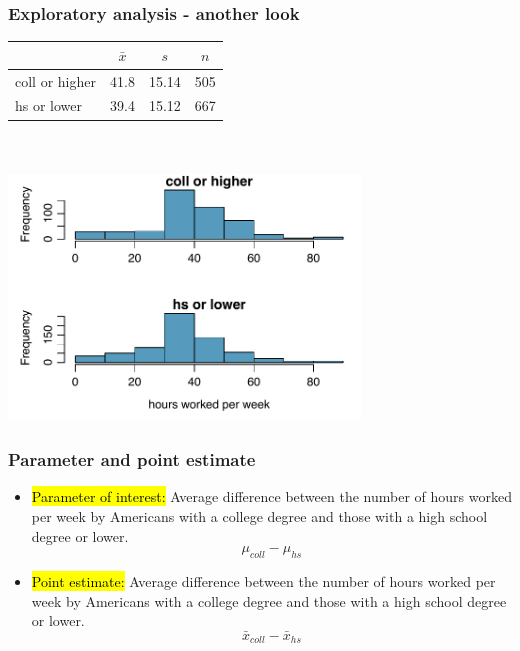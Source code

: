 \begin{frame}
\frametitle{Exploratory analysis - another look}

\begin{center}
\begin{tabular}{lccc}
\hline
  		& $\bar{x}$ 	& $s$	& $n$ \\
\hline
coll or higher	& 41.8		& 15.14	& 505 \\
hs or lower	& 39.4		& 15.12	& 667 \\
\hline
\end{tabular}
$\:$ \\
\vspace{0.5cm}
$\:$ \\
\includegraphics[width=0.7\textwidth]{5-2_diff_two_mean/figures/hrs_edu/hrs_edu_hist}
\end{center}

\end{frame}


\begin{frame}
\frametitle{Parameter and point estimate}


\pause

\begin{itemize}

\item \hl{Parameter of interest:} Average difference between the number of hours worked per week by   Americans with a college degree and those with a high school degree or lower.
\[ \mu_{coll} - \mu_{hs} \]

\pause

\item \hl{Point estimate:} Average difference between the number of hours worked per week by   Americans with a college degree and those with a high school degree or lower.
\[ \bar{x}_{coll} - \bar{x}_{hs} \]

\end{itemize}

\end{frame}

